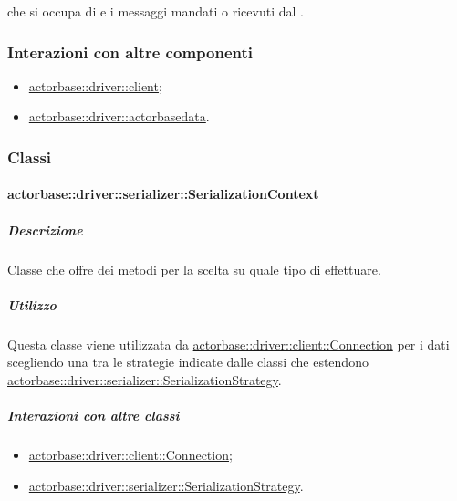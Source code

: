 \documentclass{scalatekids-article}
\begin{document}
 che si occupa di  e 
i messaggi mandati o ricevuti dal .

\subsubsection{Interazioni con altre componenti}

\begin{itemize}

\item \hyperref[sec:actorbase::driver::client]{actorbase::driver::client};
\item \hyperref[sec:actorbase::driver::actorbasedata]{actorbase::driver::actorbasedata}.

\end{itemize}

\subsubsection{Classi}

\paragraph{actorbase::driver::serializer::SerializationContext}
\label{sec:actorbase::driver::serializer::SerializationContext}

\subparagraph{Descrizione}

Classe che offre dei metodi per la scelta su quale tipo di 
effettuare.

\subparagraph{Utilizzo}

Questa classe viene utilizzata da \hyperref[sec:actorbase::driver::client::Connection]{actorbase::driver::client::Connection}
per  i dati scegliendo una tra le strategie indicate
dalle classi che estendono \hyperref[sec:actorbase::driver::serializer::SerializationStrategy]{actorbase::driver::serializer::SerializationStrategy}.

\subparagraph{Interazioni con altre classi}

\begin{itemize}

\item \hyperref[sec:actorbase::driver::client::Connection]{actorbase::driver::client::Connection};
\item \hyperref[sec:actorbase::driver::serializer::SerializationStrategy]{actorbase::driver::serializer::SerializationStrategy}.

\end{itemize}
\end{document}
